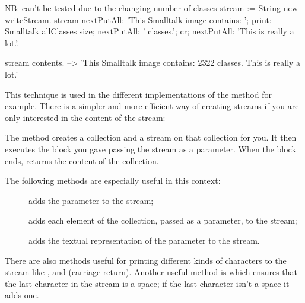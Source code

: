 \documentclass[a4paper,10pt,twoside]{book}
\begin{document}
\begin{code}{NB: can't be tested due to the changing number of classes}
stream := String new writeStream.
stream
  nextPutAll: 'This Smalltalk image contains: ';
  print: Smalltalk allClasses size;
  nextPutAll: ' classes.';
  cr;
  nextPutAll: 'This is really a lot.'.

stream contents. --> 'This Smalltalk image contains: 2322 classes.
This is really a lot.'
\end{code}

This technique is used in the different implementations of the method
 for example. There is a simpler and more efficient way
of creating streams if you are only interested in the content of the
stream:


The method  \label{sec:streamContents} creates a collection and a stream on
that collection for you. It then executes the block you gave passing
the stream as a parameter. When the block ends, 
returns the content of the collection.

The following  methods are especially useful in this context:

\begin{description}
\item[] adds the parameter to the stream;
\item[] adds each element of the collection, passed as a
  parameter, to the stream;
\item[] adds the textual representation of the parameter to the
  stream.
\end{description}

There are also methods useful for printing different kinds of characters to
the stream like ,  and
 (carriage return). Another useful
method is  which ensures that the last character
in the stream is a space; if the last character isn't a space it adds one.
\end{document}
